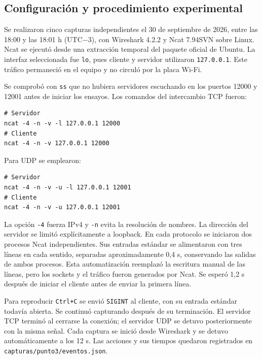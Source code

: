 \documentclass[12pt,a4paper]{article}
\begin{document}
\subsection{Configuración y procedimiento experimental}

Se realizaron cinco capturas independientes el 30 de septiembre de 2026,
entre las 18:00 y las 18:01 h (UTC$-3$), con Wireshark 4.2.2 y Ncat
7.94SVN sobre Linux. Ncat se ejecutó desde una extracción temporal del
paquete oficial de Ubuntu. La interfaz seleccionada fue \texttt{lo}, pues
cliente y servidor utilizaron \texttt{127.0.0.1}. Este tráfico permaneció
en el equipo y no circuló por la placa Wi-Fi.

Se comprobó con \texttt{ss} que no hubiera servidores escuchando en los
puertos 12000 y 12001 antes de iniciar los ensayos. Los comandos del
intercambio TCP fueron:
\par\noindent\begin{minipage}{\linewidth}
\begin{verbatim}
# Servidor
ncat -4 -n -v -l 127.0.0.1 12000
# Cliente
ncat -4 -n -v 127.0.0.1 12000
\end{verbatim}
\end{minipage}\par
Para UDP se emplearon:
\par\noindent\begin{minipage}{\linewidth}
\begin{verbatim}
# Servidor
ncat -4 -n -v -u -l 127.0.0.1 12001
# Cliente
ncat -4 -n -v -u 127.0.0.1 12001
\end{verbatim}
\end{minipage}\par
La opción \texttt{-4} fuerza IPv4 y \texttt{-n} evita la resolución de
nombres. La dirección del servidor se limitó explícitamente a loopback.
En cada protocolo se iniciaron dos procesos Ncat independientes. Sus
entradas estándar se alimentaron con tres líneas en cada sentido, separadas
aproximadamente 0,4 s, conservando las salidas de ambos procesos. Esta
automatización reemplazó la escritura manual de las líneas, pero los
sockets y el tráfico fueron generados por Ncat. Se esperó 1,2 s después
de iniciar el cliente antes de enviar la primera línea.

Para reproducir \texttt{Ctrl+C} se envió \texttt{SIGINT} al cliente, con
su entrada estándar todavía abierta. Se continuó capturando después de
su terminación. El servidor TCP terminó al cerrarse la conexión; el
servidor UDP se detuvo posteriormente con la misma señal. Cada captura
se inició desde Wireshark y se detuvo automáticamente a los 12 s.
Las acciones y sus tiempos quedaron registrados en
\texttt{capturas/punto3/eventos.json}.
\end{document}
